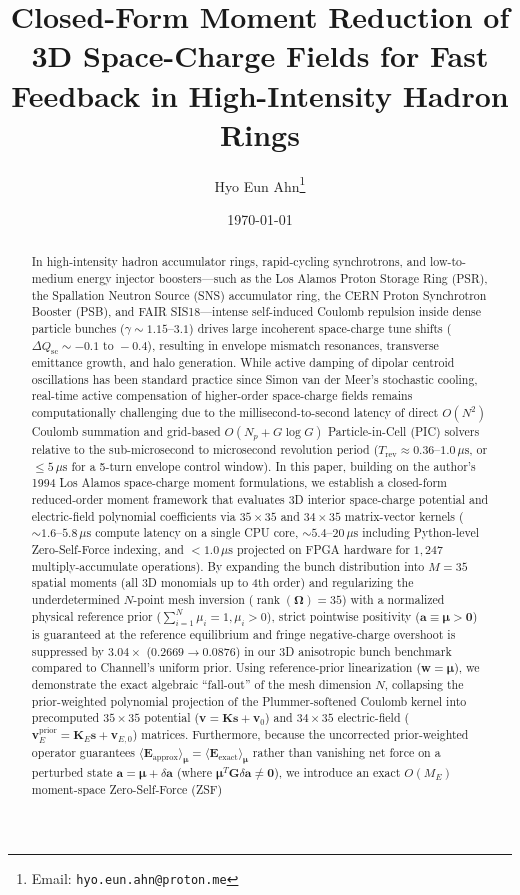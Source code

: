 \documentclass[11pt,a4paper]{article}
\title{\textbf{Closed-Form Moment Reduction of 3D Space-Charge Fields for Fast Feedback in High-Intensity Hadron Rings}}
\author{Hyo Eun Ahn\thanks{Email: \texttt{hyo.eun.ahn@proton.me}}}
\date{\today}
\newcommand{\bOmega}{\mathbf{\Omega}}
\begin{document}
\maketitle

\begin{abstract}
In high-intensity hadron accumulator rings, rapid-cycling synchrotrons, and low-to-medium energy injector boosters---such as the Los Alamos Proton Storage Ring (PSR), the Spallation Neutron Source (SNS) accumulator ring, the CERN Proton Synchrotron Booster (PSB), and FAIR SIS18---intense self-induced Coulomb repulsion inside dense particle bunches ($\gamma \sim 1.15\text{--}3.1$) drives large incoherent space-charge tune shifts ($\Delta Q_{\mathrm{sc}} \sim -0.1 \text{ to } -0.4$), resulting in envelope mismatch resonances, transverse emittance growth, and halo generation. While active damping of dipolar centroid oscillations has been standard practice since Simon van der Meer's stochastic cooling, real-time active compensation of higher-order space-charge fields remains computationally challenging due to the millisecond-to-second latency of direct $O(N^2)$ Coulomb summation and grid-based $O(N_p + G \log G)$ Particle-in-Cell (PIC) solvers relative to the sub-microsecond to microsecond revolution period ($T_{\mathrm{rev}} \approx 0.36\text{--}1.0\,\mu\mathrm{s}$, or $\le 5\,\mu\mathrm{s}$ for a 5-turn envelope control window). In this paper, building on the author's 1994 Los Alamos space-charge moment formulations, we establish a closed-form reduced-order moment framework that evaluates 3D interior space-charge potential and electric-field polynomial coefficients via $35 \times 35$ and $34 \times 35$ matrix-vector kernels ($\sim 1.6\text{--}5.8\,\mu\mathrm{s}$ compute latency on a single CPU core, $\sim 5.4\text{--}20\,\mu\mathrm{s}$ including Python-level Zero-Self-Force indexing, and $< 1.0\,\mu\mathrm{s}$ projected on FPGA hardware for $1,247$ multiply-accumulate operations). By expanding the bunch distribution into $M=35$ spatial moments (all 3D monomials up to 4th order) and regularizing the underdetermined $N$-point mesh inversion ($\operatorname{rank}(\bOmega) = 35$) with a normalized physical reference prior ($\sum_{i=1}^N \mu_i = 1, \mu_i > 0$), strict pointwise positivity ($\bm{a} \equiv \bm{\mu} > \bm{0}$) is guaranteed at the reference equilibrium and fringe negative-charge overshoot is suppressed by $3.04\times$ ($0.2669 \to 0.0876$) in our 3D anisotropic bunch benchmark compared to Channell's uniform prior. Using reference-prior linearization ($\bm{w} = \bm{\mu}$), we demonstrate the exact algebraic ``fall-out'' of the mesh dimension $N$, collapsing the prior-weighted polynomial projection of the Plummer-softened Coulomb kernel into precomputed $35 \times 35$ potential ($\bm{v} = \bm{K}\bm{s} + \bm{v}_0$) and $34 \times 35$ electric-field ($\bm{v}_E^{\mathrm{prior}} = \bm{K}_E\bm{s} + \bm{v}_{E,0}$) matrices. Furthermore, because the uncorrected prior-weighted operator guarantees $\langle \bm{E}_{\mathrm{approx}}\rangle_{\bm{\mu}} = \langle \bm{E}_{\mathrm{exact}}\rangle_{\bm{\mu}}$ rather than vanishing net force on a perturbed state $\bm{a} = \bm{\mu} + \delta\bm{a}$ (where $\bm{\mu}^T \bm{G}\delta\bm{a} \ne \bm{0}$), we introduce an exact $O(M_E)$ moment-space Zero-Self-Force (ZSF) 
\end{abstract}
\end{document}
